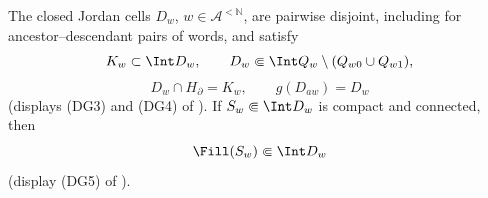 \begin{theorem}\label{thm:gap-cells}
The closed Jordan cells $D_w$, $w\in\mathcal A^{<\mathbb N}$, are
pairwise disjoint, including for ancestor--descendant pairs of words, and
satisfy
\begin{equation}\label{eq:F-cell-position}
K_w\subset\Int D_w,
\qquad
D_w\Subset\Int Q_w\setminus(Q_{w0}\cup Q_{w1}),
\end{equation}
\begin{equation}\label{eq:F-cell-isolation}
D_w\cap H_\partial=K_w,
\qquad
g(D_{aw})=D_w
\end{equation}
(displays (DG3) and (DG4) of \cite{MWman}).  If
$S_w\Subset\Int D_w$ is compact and connected, then
\begin{equation}\label{eq:F-cell-fill}
\Fill(S_w)\Subset\Int D_w
\end{equation}
(display (DG5) of \cite{MWman}).
\end{theorem}

